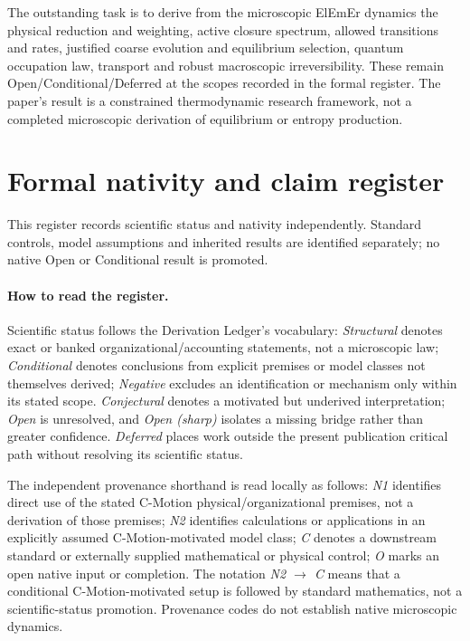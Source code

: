 \documentclass[11pt]{article}
\theoremstyle{definition}
\newcommand{\ElEmEr}{\mbox{ElEmEr}}
\begin{document}
The outstanding task is to derive from the microscopic \ElEmEr{} dynamics the
physical reduction and weighting, active closure spectrum, allowed transitions
and rates, justified coarse evolution and equilibrium selection, quantum
occupation law, transport and robust macroscopic irreversibility.  These remain
Open/Conditional/Deferred at the scopes recorded in the formal register.  The
paper's result is a constrained thermodynamic research framework, not a
completed microscopic derivation of equilibrium or entropy production.

\newpage

\appendix

\section{Formal nativity and claim register}
\label{sec:register}
This register records scientific status and nativity independently.  Standard
controls, model assumptions and inherited results are identified separately;
no native Open or Conditional result is promoted.

\paragraph{How to read the register.}
Scientific status follows the Derivation Ledger's vocabulary:
\emph{Structural} denotes exact or banked organizational/accounting statements,
not a microscopic law; \emph{Conditional} denotes conclusions from explicit
premises or model classes not themselves derived; \emph{Negative} excludes an
identification or mechanism only within its stated scope. \emph{Conjectural}
denotes a motivated but underived interpretation; \emph{Open} is unresolved,
and \emph{Open (sharp)} isolates a missing bridge rather than greater confidence.
\emph{Deferred} places work outside the present publication critical path
without resolving its scientific status.

The independent provenance shorthand is read locally as follows:
\emph{N1} identifies direct use of the stated C-Motion physical/organizational
premises, not a derivation of those premises; \emph{N2} identifies calculations
or applications in an explicitly assumed C-Motion-motivated model class;
\emph{C} denotes a downstream standard or externally supplied mathematical or
physical control; \emph{O} marks an open native input or completion.
The notation \emph{N2 $\to$ C} means that a conditional C-Motion-motivated
setup is followed by standard mathematics, not a scientific-status promotion.
Provenance codes do not establish native microscopic dynamics.
\end{document}
